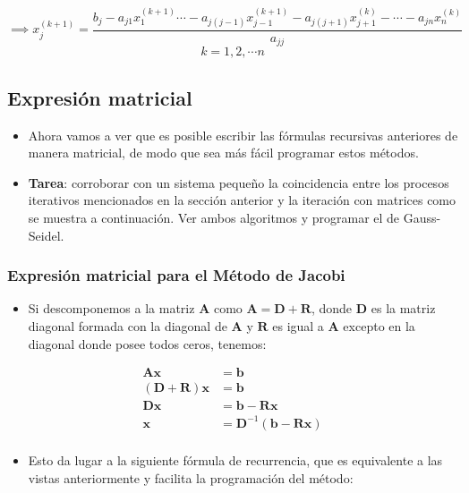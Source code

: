 \documentclass[openany]{book}
\providecommand{\tightlist}{%
  \setlength{\itemsep}{0pt}\setlength{\parskip}{0pt}}
\begin{document}
\[
\implies
x_j^{(k+1)} = \frac{b_j - a_{j1}x_1^{(k+1)} \cdots - a_{j(j-1)}x_{j-1}^{(k+1)} - a_{j(j+1)}x_{j+1}^{(k)} - \cdots - a_{jn}x_n^{(k)}}{ a_{jj}}
\]
\[
k=1, 2, \cdots n
\]

\hypertarget{expresiuxf3n-matricial}{%
\subsection{Expresión matricial}\label{expresiuxf3n-matricial}}

\begin{itemize}
\tightlist
\item
  Ahora vamos a ver que es posible escribir las fórmulas recursivas anteriores de manera matricial, de modo que sea más fácil programar estos métodos.
\item
  \textbf{Tarea}: corroborar con un sistema pequeño la coincidencia entre los procesos iterativos mencionados en la sección anterior y la iteración con matrices como se muestra a continuación. Ver ambos algoritmos y programar el de Gauss-Seidel.
\end{itemize}

\hypertarget{expresiuxf3n-matricial-para-el-muxe9todo-de-jacobi}{%
\subsubsection*{Expresión matricial para el Método de Jacobi}\label{expresiuxf3n-matricial-para-el-muxe9todo-de-jacobi}}

\begin{itemize}
\tightlist
\item
  Si descomponemos a la matriz \(\mathbf{A}\) como \(\mathbf{A=D+R}\), donde \(\mathbf{D}\) es la matriz diagonal formada con la diagonal de \(\mathbf{A}\) y \(\mathbf{R}\) es igual a \(\mathbf{A}\) excepto en la diagonal donde posee todos ceros, tenemos:
\end{itemize}

\begin{align*} 
\mathbf{Ax} &= \mathbf{b} \\
\mathbf{(D+R)x} &= \mathbf{b} \\
\mathbf{Dx} &= \mathbf{b} - \mathbf{Rx}  \\
\mathbf{x} &= \mathbf{D}^{-1} (\mathbf{b} - \mathbf{Rx})  \\
\end{align*}

\begin{itemize}
\tightlist
\item
  Esto da lugar a la siguiente fórmula de recurrencia, que es equivalente a las vistas anteriormente y facilita la programación del método:
\end{itemize}
\end{document}
